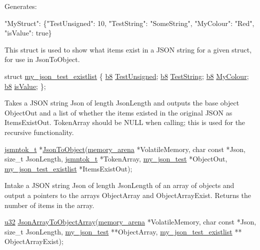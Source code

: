 Generates\+: 
\begin{DoxyCode}
"MyStruct": \{"TestUnsigned": 10, "TestString": "SomeString", "MyColour": "Red", "isValue": true\}
\end{DoxyCode}


This struct is used to show what items exist in a J\+S\+ON string for a given struct, for use in {\ttfamily Json\+To\+Object}. 
\begin{DoxyCode}
\textcolor{keyword}{struct }\hyperlink{structmy__json__test__existlist}{my\_json\_test\_existlist}
\{
   \hyperlink{ab__common_8h_a70e369648385b50f2d0588e8e8745275}{b8} \hyperlink{structmy__json__test__existlist_abcc3320a088be44f3780f7768da67efa}{TestUnsigned};
   \hyperlink{ab__common_8h_a70e369648385b50f2d0588e8e8745275}{b8} \hyperlink{structmy__json__test__existlist_ad1bf35a0d6153e177322567228ae0203}{TestString};
   \hyperlink{ab__common_8h_a70e369648385b50f2d0588e8e8745275}{b8} \hyperlink{structmy__json__test__existlist_adc7bd401b4e560999733be88e43b5b7f}{MyColour};
   \hyperlink{ab__common_8h_a70e369648385b50f2d0588e8e8745275}{b8} \hyperlink{structmy__json__test__existlist_ad8b82af159a6dd0709800ca082156caf}{isValue};
\};
\end{DoxyCode}


Takes a J\+S\+ON string {\ttfamily Json} of length {\ttfamily Json\+Length} and outputs the base object {\ttfamily Object\+Out} and a list of whether the items existed in the original J\+S\+ON as {\ttfamily Items\+Exist\+Out}. {\ttfamily Token\+Array} should be {\ttfamily N\+U\+LL} when calling; this is used for the recursive functionality. 
\begin{DoxyCode}
\hyperlink{structjsmntok__t}{jsmntok\_t} *\hyperlink{test_8h_ae6d119cc4c994c6ce626578dc0fbfb7d}{JsonToObject}(\hyperlink{structmemory__arena}{memory\_arena} *VolatileMemory, \textcolor{keywordtype}{char} \textcolor{keyword}{const} *Json, \textcolor{keywordtype}{
      size\_t} JsonLength, \hyperlink{structjsmntok__t}{jsmntok\_t} *TokenArray, \hyperlink{structmy__json__test}{my\_json\_test} *ObjectOut, 
      \hyperlink{structmy__json__test__existlist}{my\_json\_test\_existlist} *ItemsExistOut);
\end{DoxyCode}


Intake a J\+S\+ON string {\ttfamily Json} of length {\ttfamily Json\+Length} of an array of objects and output a pointers to the arrays {\ttfamily Object\+Array} and {\ttfamily Object\+Array\+Exist}. Returns the number of items in the array. 
\begin{DoxyCode}
\hyperlink{ab__common_8h_afaa62991928fb9fb18ff0db62a040aba}{u32}
\hyperlink{test_8h_a64ef531190fc6ef16b117e7f5ca1f528}{JsonArrayToObjectArray}(\hyperlink{structmemory__arena}{memory\_arena} *VolatileMemory, \textcolor{keywordtype}{char} \textcolor{keyword}{const} *Json, \textcolor{keywordtype}{
      size\_t} JsonLength, \hyperlink{structmy__json__test}{my\_json\_test} **ObjectArray, \hyperlink{structmy__json__test__existlist}{my\_json\_test\_existlist} **
      ObjectArrayExist);
\end{DoxyCode}


